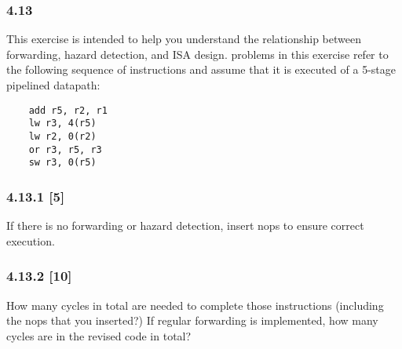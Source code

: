 \documentclass[fleqn]{article}
\begin{document}
\subsubsection*{4.13} This exercise is intended to help you understand the relationship between forwarding, hazard detection,
and ISA design. problems in this exercise refer to the following sequence of instructions and assume that it
is executed of a 5-stage pipelined datapath:
\begin{lstlisting}
    add r5, r2, r1
    lw r3, 4(r5)
    lw r2, 0(r2)
    or r3, r5, r3
    sw r3, 0(r5)
\end{lstlisting}


\subsubsection*{4.13.1 [5] \textrangle} If there is no forwarding or hazard detection, insert nops to ensure correct execution.

\subsubsection*{4.13.2 [10] \textrangle} How many cycles in total are needed to complete those instructions (including the nops that you
inserted?) If regular forwarding is implemented, how many cycles are in the revised code in total?
\vspace{0.125in}
\end{document}
